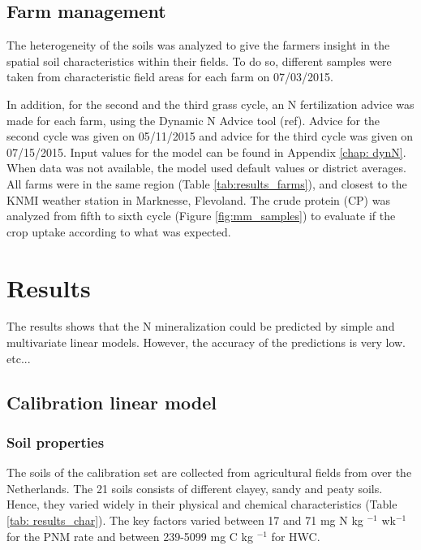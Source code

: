 \documentclass[10pt,twoside,dutch,english]{report}
\begin{document}
\section{Farm management}
The heterogeneity of the soils was analyzed to give the farmers insight in the spatial soil characteristics within their fields. To do so, different samples were taken from characteristic field areas for each farm on 07/03/2015. 

In addition, for the second and the third grass cycle, an N fertilization advice was made for each farm, using the Dynamic N Advice tool (ref). Advice for the second cycle was given on 05/11/2015  and advice for the third cycle was given on 07/15/2015. Input values for the model can be found in Appendix \ref{chap: dynN}. When data was not available, the model used default values or district averages. All farms were in the same region (Table \ref{tab:results_farms}), and closest to the KNMI weather station in Marknesse, Flevoland. The crude protein (CP) was analyzed from fifth to sixth cycle (Figure \ref{fig:mm_samples}) to evaluate if the crop uptake according to what was expected. 



\chapter{Results}

The results shows that the N mineralization could be predicted by simple and multivariate linear models. However, the accuracy of the predictions is very low. etc... %
\section{Calibration linear model}
\subsection{Soil properties}
The soils of the calibration set are collected from agricultural fields from over the Netherlands. The 21 soils consists of different clayey, sandy and peaty soils. Hence, they varied widely in their physical and chemical characteristics (Table \ref{tab: results_char}). The key factors varied between 17 and 71 mg N kg $^{-1}$ wk$^{-1}$ for the PNM rate and between 239-5099 mg C kg $^{-1}$ for HWC. 
\end{document}
